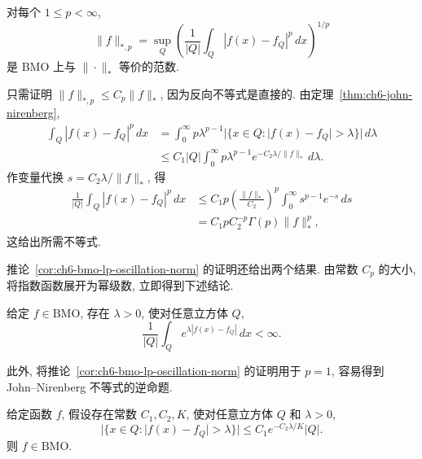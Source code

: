 \begin{Corollary}
\label{cor:ch6-bmo-lp-oscillation-norm}
对每个 $1\le p<\infty$,
\[
 \|f\|_{*,p}
 =\sup_Q\left(\frac1{|Q|}\int_Q|f(x)-f_Q|^p\,dx\right)^{1/p}
\]
是 BMO 上与 $\|\cdot\|_*$ 等价的范数.
\end{Corollary}

\begin{Proof}
只需证明 $\|f\|_{*,p}\le C_p\|f\|_*$, 因为反向不等式是直接的. 由定理~\ref{thm:ch6-john-nirenberg},
\[
\begin{aligned}
 \int_Q|f(x)-f_Q|^p\,dx
 &=\int_0^\infty p\lambda^{p-1}
 |\{x\in Q:|f(x)-f_Q|>\lambda\}|\,d\lambda\\
 &\le C_1|Q|\int_0^\infty p\lambda^{p-1}
 e^{-C_2\lambda/\|f\|_*}\,d\lambda.
\end{aligned}
\]
作变量代换 $s=C_2\lambda/\|f\|_*$, 得
\[
\begin{aligned}
 \frac1{|Q|}\int_Q|f(x)-f_Q|^p\,dx
 &\le C_1p\left(\frac{\|f\|_*}{C_2}\right)^p
 \int_0^\infty s^{p-1}e^{-s}\,ds\\
 &=C_1pC_2^{-p}\Gamma(p)\|f\|_*^p,
\end{aligned}
\]
这给出所需不等式.
\end{Proof}

推论~\ref{cor:ch6-bmo-lp-oscillation-norm} 的证明还给出两个结果. 由常数 $C_p$ 的大小, 将指数函数展开为幂级数, 立即得到下述结论.

\begin{Corollary}
\label{cor:ch6-bmo-exponential-integrability}
给定 $f\in\mathrm{BMO}$, 存在 $\lambda>0$, 使对任意立方体 $Q$,
\[
 \frac1{|Q|}\int_Qe^{\lambda|f(x)-f_Q|}\,dx<\infty.
\]
\end{Corollary}

此外, 将推论~\ref{cor:ch6-bmo-lp-oscillation-norm} 的证明用于 $p=1$, 容易得到 John--Nirenberg 不等式的逆命题.

\begin{Corollary}
\label{cor:ch6-john-nirenberg-converse}
给定函数 $f$, 假设存在常数 $C_1,C_2,K$, 使对任意立方体 $Q$ 和 $\lambda>0$,
\[
 |\{x\in Q:|f(x)-f_Q|>\lambda\}|
 \le C_1e^{-C_2\lambda/K}|Q|.
\]
则 $f\in\mathrm{BMO}$.
\end{Corollary}
